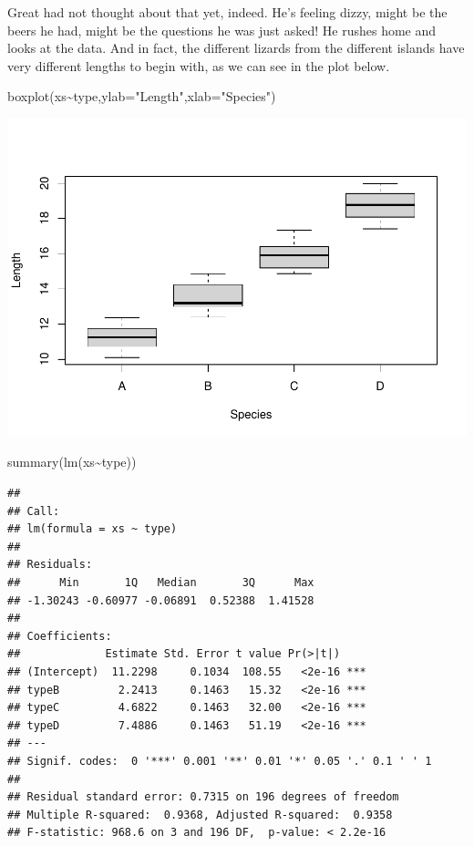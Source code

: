 \documentclass[
]{book}
\newenvironment{Shaded}{\begin{snugshade}}{\end{snugshade}}
\newcommand{\AttributeTok}[1]{\textcolor[rgb]{0.77,0.63,0.00}{#1}}
\newcommand{\FunctionTok}[1]{\textcolor[rgb]{0.00,0.00,0.00}{#1}}
\newcommand{\NormalTok}[1]{#1}
\newcommand{\SpecialCharTok}[1]{\textcolor[rgb]{0.00,0.00,0.00}{#1}}
\newcommand{\StringTok}[1]{\textcolor[rgb]{0.31,0.60,0.02}{#1}}
\begin{document}
Great had not thought about that yet, indeed. He's feeling dizzy, might be the beers he had, might be the questions he was just asked! He rushes home and looks at the data. And in fact, the different lizards from the different islands have very different lengths to begin with, as we can see in the plot below.

\begin{Shaded}
\begin{Highlighting}[]
\FunctionTok{boxplot}\NormalTok{(xs}\SpecialCharTok{\textasciitilde{}}\NormalTok{type,}\AttributeTok{ylab=}\StringTok{"Length"}\NormalTok{,}\AttributeTok{xlab=}\StringTok{"Species"}\NormalTok{)}
\end{Highlighting}
\end{Shaded}

\includegraphics{ECOMODbook_files/figure-latex/a10.6-1.pdf}

\begin{Shaded}
\begin{Highlighting}[]
\FunctionTok{summary}\NormalTok{(}\FunctionTok{lm}\NormalTok{(xs}\SpecialCharTok{\textasciitilde{}}\NormalTok{type))}
\end{Highlighting}
\end{Shaded}

\begin{verbatim}
## 
## Call:
## lm(formula = xs ~ type)
## 
## Residuals:
##      Min       1Q   Median       3Q      Max 
## -1.30243 -0.60977 -0.06891  0.52388  1.41528 
## 
## Coefficients:
##             Estimate Std. Error t value Pr(>|t|)    
## (Intercept)  11.2298     0.1034  108.55   <2e-16 ***
## typeB         2.2413     0.1463   15.32   <2e-16 ***
## typeC         4.6822     0.1463   32.00   <2e-16 ***
## typeD         7.4886     0.1463   51.19   <2e-16 ***
## ---
## Signif. codes:  0 '***' 0.001 '**' 0.01 '*' 0.05 '.' 0.1 ' ' 1
## 
## Residual standard error: 0.7315 on 196 degrees of freedom
## Multiple R-squared:  0.9368, Adjusted R-squared:  0.9358 
## F-statistic: 968.6 on 3 and 196 DF,  p-value: < 2.2e-16
\end{verbatim}
\end{document}
